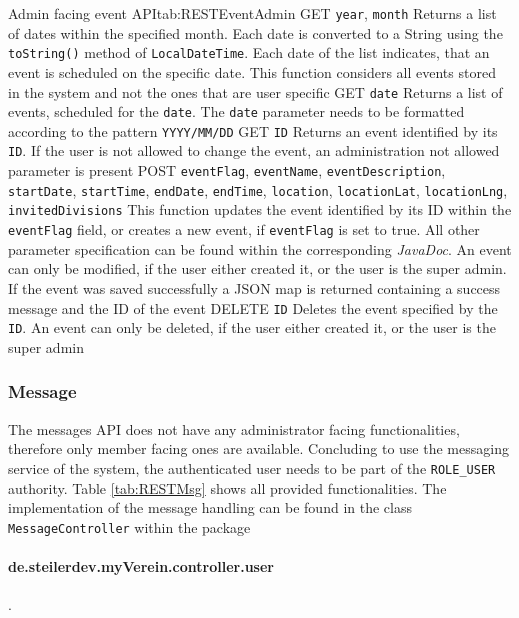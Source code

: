 \begin{RESTTable}{Admin facing event API}{tab:RESTEventAdmin}
		{GET}
		{\texttt{year}, \texttt{month}}
		{Returns a list of dates within the specified month. Each date is converted to a String using the \texttt{toString()} method of \texttt{LocalDateTime}. Each date of the list indicates, that an event is scheduled on the specific date. This function considers all events stored in the system and not the ones that are user specific}
		{GET}
		{\texttt{date}}
		{Returns a list of events, scheduled for the \texttt{date}. The \texttt{date} parameter needs to be formatted according to the pattern \texttt{YYYY/MM/DD}}
		{GET}
		{\texttt{ID}}
		{Returns an event identified by its \texttt{ID}. If the user is not allowed to change the event, an administration not allowed parameter is present}
		{POST}
		{\texttt{eventFlag}, \texttt{eventName}, \texttt{eventDescription}, \texttt{startDate}, \texttt{startTime}, \texttt{endDate}, \texttt{endTime}, \texttt{location}, \texttt{locationLat}, \texttt{locationLng}, \texttt{invitedDivisions}}
		{This function updates the event identified by its ID within the \texttt{eventFlag} field, or creates a new event, if \texttt{eventFlag} is set to true. All other parameter specification can be found within the corresponding \emph{JavaDoc}. An event can only be modified, if the user either created it, or the user is the super admin. If the event was saved successfully a JSON map is returned containing a success message and the ID of the event}
		{DELETE}
		{\texttt{ID}}
		{Deletes the event specified by the \texttt{ID}. An event can only be deleted, if the user either created it, or the user is the super admin}	
\end{RESTTable}

\subsubsection{Message}

The messages \gls{API} does not have any administrator facing functionalities, therefore only member facing ones are available. Concluding to use the messaging service of the system, the authenticated user needs to be part of the \texttt{ROLE\_USER} authority. Table \vref{tab:RESTMsg} shows all provided functionalities. The implementation of the message handling can be found in the class \texttt{MessageController} within the package \paragraph{de.steilerdev.myVerein.controller.user}.

